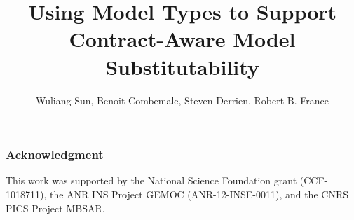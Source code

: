 \documentclass[]{llncs}
\begin{document}
\title{Using Model Types to Support \\Contract-Aware Model Substitutability}

\author{ %
	Wuliang Sun, Benoit Combemale, Steven Derrien, Robert B. France
}



\maketitle
\thispagestyle{empty}

\setcounter{footnote}{0}

\begin{abstract}
	
	
\end{abstract}


%


%


%









\subsubsection*{Acknowledgment}
%
This work was supported by the National Science Foundation grant (CCF-1018711), the ANR INS Project GEMOC (ANR-12-INSE-0011), and the CNRS PICS Project MBSAR.


%


% 
\end{document}
